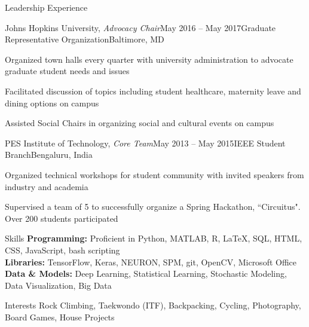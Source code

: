 \documentclass{resume}
\begin{document}
  \begin{rSection}{Leadership Experience}
          \begin{rSubsection}{Johns Hopkins University, \textit{Advocacy Chair}}{May 2016 -- May 2017}{Graduate Representative Organization}{Baltimore, MD}
\item Organized town halls every quarter with university administration to advocate graduate student needs and issues
\item Facilitated discussion of topics including student healthcare, maternity leave and dining options on campus
\item Assisted Social Chairs in organizing social and cultural events on campus
    \end{rSubsection}

\begin{rSubsection}{PES Institute of Technology, \textit{Core Team}}{May 2013 -- May 2015}{IEEE Student Branch}{Bengaluru, India}
\item Organized technical workshops for student community with invited speakers from industry and academia
\item Supervised a team of 5 to successfully organize a Spring Hackathon, ``Circuitus". Over 200 students participated
    \end{rSubsection}
  \end{rSection}   

\vspace{1em}

    \begin{rSection}{Skills}
\textbf{Programming:} Proficient in Python, MATLAB, R, \LaTeX, SQL, HTML, CSS, JavaScript, bash scripting \\
\textbf{Libraries:} TensorFlow, Keras, NEURON, SPM, git, OpenCV, Microsoft Office \\
\textbf{Data \& Models:} Deep Learning, Statistical Learning, Stochastic Modeling, Data Visualization, Big Data \\
\end{rSection} 

\begin{rSection}{Interests}
Rock Climbing, Taekwondo (ITF), Backpacking, Cycling, Photography, Board Games, House Projects
\end{rSection} 
\end{document}
